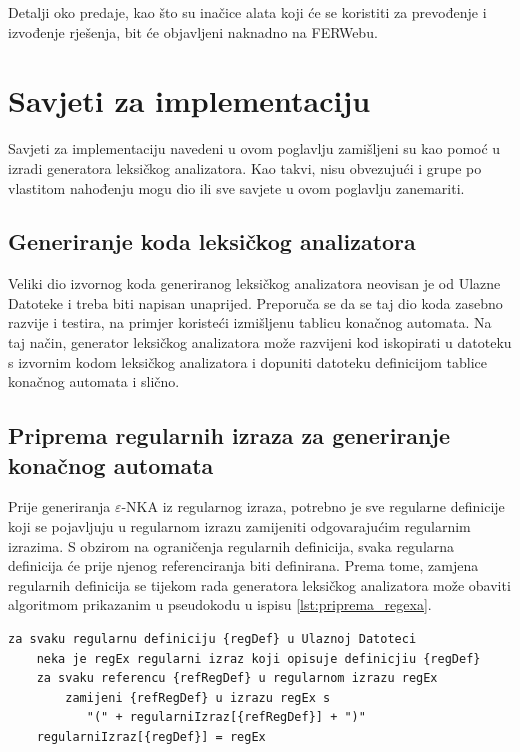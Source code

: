 \documentclass[times, 12pt, utf8]{book}
\begin{document}
Detalji oko predaje, kao što su inačice alata koji će se koristiti za prevođenje i izvođenje rješenja, bit će objavljeni naknadno na FERWebu.

\section{Savjeti za implementaciju}
Savjeti za implementaciju navedeni u ovom poglavlju zamišljeni su kao pomoć u izradi generatora leksičkog analizatora.
Kao takvi, nisu obvezujući i grupe po vlastitom nahođenju mogu dio ili sve savjete u ovom poglavlju zanemariti.

\subsection{Generiranje koda leksičkog analizatora}
Veliki dio izvornog koda generiranog leksičkog analizatora neovisan je od Ulazne Datoteke i treba biti napisan unaprijed.
Preporuča se da se taj dio koda zasebno razvije i testira, na primjer koristeći izmišljenu tablicu konačnog automata.
Na taj način, generator leksičkog analizatora može razvijeni kod iskopirati u datoteku s izvornim kodom leksičkog analizatora i dopuniti datoteku definicijom tablice konačnog automata i slično.

\subsection{Priprema regularnih izraza za generiranje konačnog automata}
Prije generiranja \(\varepsilon\)-NKA iz regularnog izraza, potrebno je sve regularne definicije koji se pojavljuju u regularnom izrazu zamijeniti odgovarajućim regularnim izrazima.
S obzirom na ograničenja regularnih definicija, svaka regularna definicija će prije njenog referenciranja biti definirana.
Prema tome, zamjena regularnih definicija se tijekom rada generatora leksičkog analizatora može obaviti algoritmom prikazanim u pseudokodu u ispisu \ref{lst:priprema_regexa}.

\begin{lstlisting}[caption={Pseudokod za pripremu regularnih izraza za generiranje konačnog automata.},label=lst:priprema_regexa]
za svaku regularnu definiciju {regDef} u Ulaznoj Datoteci
	neka je regEx regularni izraz koji opisuje definicjiu {regDef}
	za svaku referencu {refRegDef} u regularnom izrazu regEx
		zamijeni {refRegDef} u izrazu regEx s
           "(" + regularniIzraz[{refRegDef}] + ")"
	regularniIzraz[{regDef}] = regEx
\end{lstlisting}
\end{document}
